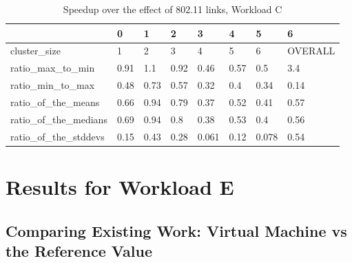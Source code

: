 \begin{table}[H]
\centering
\begin{tabular}{llllllll}
\toprule
{} &    0 &    1 &    2 &     3 &    4 &     5 &        6 \\
\midrule
cluster\_size         &    1 &    2 &    3 &     4 &    5 &     6 &  OVERALL \\
ratio\_max\_to\_min     & 0.91 &  1.1 & 0.92 &  0.46 & 0.57 &   0.5 &      3.4 \\
ratio\_min\_to\_max     & 0.48 & 0.73 & 0.57 &  0.32 &  0.4 &  0.34 &     0.14 \\
ratio\_of\_the\_means   & 0.66 & 0.94 & 0.79 &  0.37 & 0.52 &  0.41 &     0.57 \\
ratio\_of\_the\_medians & 0.69 & 0.94 &  0.8 &  0.38 & 0.53 &   0.4 &     0.56 \\
ratio\_of\_the\_stddevs & 0.15 & 0.43 & 0.28 & 0.061 & 0.12 & 0.078 &     0.54 \\
\bottomrule
\end{tabular}
\caption{Speedup over the effect of 802.11 links, Workload C}
\label{table:wlan_v_eth_c_speedup}
\end{table}





\section{Results for Workload E}
\subsection{Comparing Existing Work: Virtual Machine vs the Reference Value}
